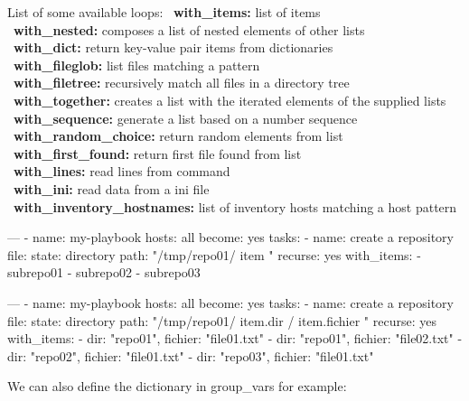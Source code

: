 \documentclass{refcard}
\begin{document}
List of some available loops:
\textbullet\ \textbf{with\_items:} list of items\\
\textbullet\ \textbf{with\_nested:} composes a list of nested elements of other lists\\
\textbullet\ \textbf{with\_dict:} return key-value pair items from dictionaries\\
\textbullet\ \textbf{with\_fileglob:} list files matching a pattern\\
\textbullet\ \textbf{with\_filetree:} recursively match all files in a directory tree\\
\textbullet\ \textbf{with\_together:} creates a list with the iterated elements of the supplied lists\\
\textbullet\ \textbf{with\_sequence:} generate a list based on a number sequence\\
\textbullet\ \textbf{with\_random\_choice:} return random elements from list\\
\textbullet\ \textbf{with\_first\_found:} return first file found from list\\
\textbullet\ \textbf{with\_lines:} read lines from command\\
\textbullet\ \textbf{with\_ini:} read data from a ini file\\
\textbullet\ \textbf{with\_inventory\_hostnames:} list of inventory hosts matching a host pattern\\

\begin{yamlbox}[title={playbook with loops 1}]
---
- name: my-playbook
  hosts: all
  become: yes
  tasks:
  - name: create a repository
    file: 
      state: directory
      path: "/tmp/repo01/{{ item }}"
      recurse: yes
    with_items:
    - subrepo01
    - subrepo02
    - subrepo03
\end{yamlbox}

\begin{yamlbox}[title={playbook with loops and dictionary}]
  ---
  - name: my-playbook
    hosts: all
    become: yes
    tasks:
    - name: create a repository
      file: 
        state: directory
        path: "/tmp/repo01/{{ item.dir }}/{{ item.fichier }}"
        recurse: yes
      with_items:
      - {dir: "repo01", fichier: "file01.txt"}
      - {dir: "repo01", fichier: "file02.txt"}
      - {dir: "repo02", fichier: "file01.txt"}
      - {dir: "repo03", fichier: "file01.txt"}
  \end{yamlbox}

  We can also define the dictionary in group\_vars for example:
\end{document}
